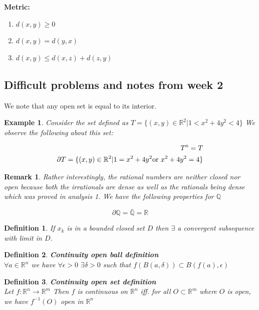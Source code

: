 \documentclass[titlepage]{article}
\newtheorem{remark}{Remark}[section]
\newtheorem{definition}{Definition}
\newcommand{\interior}[1]{%
  {\kern0pt#1}^{\mathrm{o}}%
}
\newcommand{\Rn}{\mathbb{R}^n}
\newcommand{\Rm}{\mathbb{R}^m}
\newcommand{\R}{\mathbb{R}}
\newtheorem{example}{Example}[section]
\begin{document}
\textbf{Metric:}
\begin{enumerate}
    \item $d(x,y) \geq 0$
    \item $d(x,y) = d(y,x)$
    \item $d(x,y) \leq d(x,z) + d(z,y)$
\end{enumerate}

\subsection{Difficult problems and notes from week 2}
We note that any open set is equal to its interior. 

\begin{example}
Consider the set defined as $ T = \{(x,y) \in \mathbb{R}^{2} | 1 < x^{2} + 4y^{2} < 4 \}$
We observe the following about this set:

\begin{align*}
     \interior{T} = T \\
     \partial{T} = \{(x,y) \in \mathbb{R}^{2} | 1 = x^{2} + 4y^{2} \text{or} \ x^{2} + 4y^{2} = 4 \}
\end{align*}
\end{example}

\begin{remark}
Rather interestingly, the rational numbers are neither closed nor open because both the irrationals are dense as well as the rationals being dense which was proved in analysis 1. We have the following properties for $\mathbb{Q}$

$$ \partial \mathbb{Q} = \bar{\mathbb{Q}} = \R$$
\end{remark}

\begin{definition}
If $x_{k}$ is in a bounded closed set $D$ then $\exists$ a convergent subsequence with limit in $D$.
\end{definition}

\begin{definition} \textbf{Continuity open ball definition}
\\
$\forall a \in \Rn$ we have $\forall \epsilon > 0$ $\exists \delta > 0 $ such that $f(B(a,\delta)) \subset B(f(a), \epsilon)$
\end{definition}

\begin{definition} \textbf{Continuity open set definition}
\\
Let $f: \Rn \to \Rm$ Then $f$ is continuous on $\Rn$ iff. for all $ O \subset \Rm$ where $O$ is open, we have $f^{-1}(O)$ open in $\Rn$
\end{definition}
\end{document}
